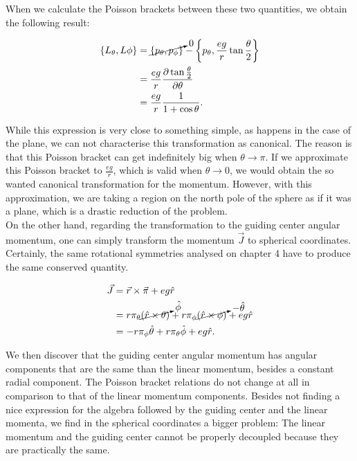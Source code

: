 When we calculate the Poisson brackets between these two quantities, we obtain the following result:

\begin{align*}
\left\lbrace L_\theta, L\phi \right\rbrace &= \cancelto{0}{\left\lbrace p_\theta, p_\phi \right\rbrace}-\left\lbrace p_\theta, \frac{eg}{r}\tan{\frac{\theta}{2}} \right\rbrace\\
&= \frac{eg}{r}\frac{\partial \tan{\frac{\theta}{2}} }{\partial \theta}\\
&=  \frac{eg}{r} \frac{1}{1+\cos{\theta}}.
\end{align*}

While this expression is very close to something simple, as happens in the case of the plane, we can not characterise this transformation as canonical. The reason is that this Poisson bracket can get indefinitely big when $\theta \to \pi$. If we approximate this Poisson bracket to $\frac{eg}{r}$, which is valid when $\theta \to 0$, we would obtain the so wanted canonical transformation for the momentum. However, with this approximation, we are taking a region on the north pole of the sphere as if it was a plane, which is a drastic reduction of the problem.\\

On the other hand, regarding the transformation to the guiding center angular momentum, one can simply transform the momentum $\vec{J}$ to spherical coordinates. Certainly, the same rotational symmetries analysed on chapter 4 have to produce the same conserved quantity.

\begin{align*}
\vec{J} &= \vec{r}\times\vec{\pi} + eg\hat{r}\\
&= r\pi_\theta \cancelto{\hat{\phi}}{(\hat{r}\times \theta)} + r\pi_\phi \cancelto{-\hat{\theta}}{(\hat{r}\times \phi)} + eg\hat{r}\\
&= -r\pi_\phi \hat{\theta} + r\pi_\theta \hat{\phi} + eg\hat{r}.
\end{align*}

We then discover that the guiding center angular momentum has angular components that are the same than the linear momentum, besides a constant radial component. The Poisson bracket relations do not change at all in comparison to that of the linear momentum components. Besides not finding a nice expression for the algebra followed by the guiding center and the linear momenta, we find in the spherical coordinates a bigger problem: The linear momentum and the guiding center cannot be properly decoupled because they are practically the same.\\

